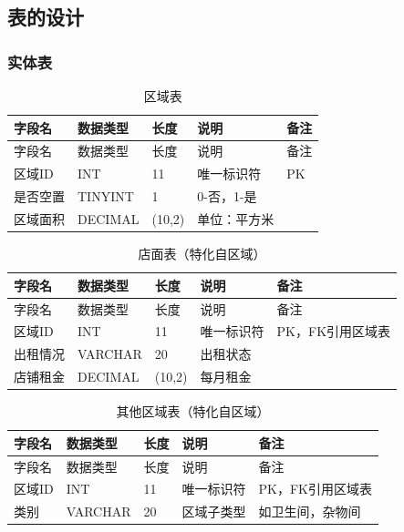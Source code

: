 \documentclass[]{article}
\begin{document}
\hypertarget{ux8868ux7684ux8bbeux8ba1}{%
\subsection{表的设计}\label{ux8868ux7684ux8bbeux8ba1}}

\hypertarget{ux5b9eux4f53ux8868}{%
\subsubsection{实体表}\label{ux5b9eux4f53ux8868}}

\begin{longtable}[]{@{}lllll@{}}
\caption{区域表}\\
\toprule
字段名 & 数据类型 & 长度 & 说明 & 备注 \\
\midrule
\endfirsthead
\toprule
字段名 & 数据类型 & 长度 & 说明 & 备注 \\
\midrule
\endhead
区域ID & INT & 11 & 唯一标识符 & PK \\
是否空置 & TINYINT & 1 & 0-否，1-是 & \\
区域面积 & DECIMAL & (10,2) & 单位：平方米 & \\
\bottomrule
\end{longtable}

\begin{longtable}[]{@{}lllll@{}}
\caption{店面表（特化自区域）}\\
\toprule
字段名 & 数据类型 & 长度 & 说明 & 备注 \\
\midrule
\endfirsthead
\toprule
字段名 & 数据类型 & 长度 & 说明 & 备注 \\
\midrule
\endhead
区域ID & INT & 11 & 唯一标识符 & PK，FK引用区域表 \\
出租情况 & VARCHAR & 20 & 出租状态 & \\
店铺租金 & DECIMAL & (10,2) & 每月租金 & \\
\bottomrule
\end{longtable}

\begin{longtable}[]{@{}lllll@{}}
\caption{其他区域表（特化自区域）}\\
\toprule
字段名 & 数据类型 & 长度 & 说明 & 备注 \\
\midrule
\endfirsthead
\toprule
字段名 & 数据类型 & 长度 & 说明 & 备注 \\
\midrule
\endhead
区域ID & INT & 11 & 唯一标识符 & PK，FK引用区域表 \\
类别 & VARCHAR & 20 & 区域子类型 & 如卫生间，杂物间 \\
\bottomrule
\end{longtable}
\end{document}
